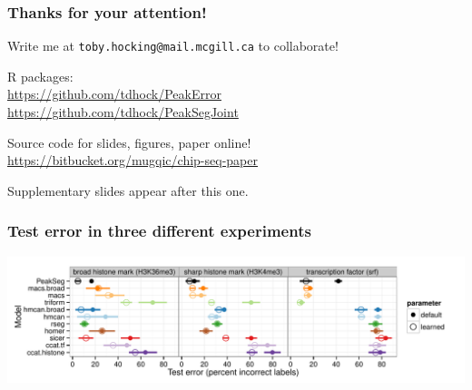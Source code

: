 \documentclass{beamer}
\begin{document}
\begin{frame}
  \frametitle{Thanks for your attention!}
  Write me at \alert{\texttt{toby.hocking@mail.mcgill.ca}} to collaborate!

  \vskip 1cm

  R packages:\\
  \url{https://github.com/tdhock/PeakError}\\
  \url{https://github.com/tdhock/PeakSegJoint}

  \vskip 1cm

  Source code for slides, figures, paper online!\\
  \small
  \url{https://bitbucket.org/mugqic/chip-seq-paper}
  \vskip 1cm

  Supplementary slides appear after this one.

\end{frame}

\begin{frame}
  \frametitle{Test error in three different experiments}
  \includegraphics[width=1.1\textwidth]{figure-test-error-dots-mean.pdf}
\end{frame}
\end{document}

